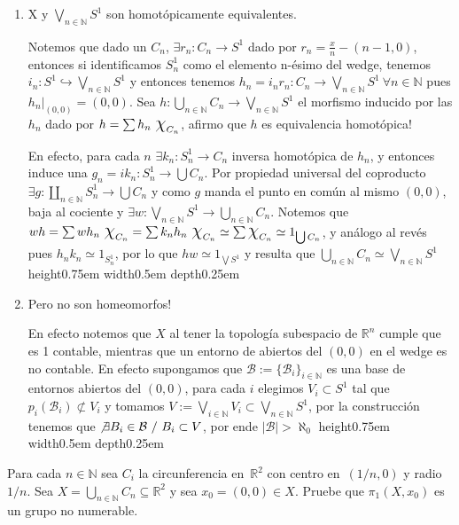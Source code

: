 \documentclass[11pt]{article}
\newcommand{\R}{{\mathbb{R}}}
\newcommand{\N}{{\mathbb{N}}}
\newenvironment{proof}[1][Demostraci\'on]{\begin{trivlist}
\item[\hskip \labelsep {\bfseries #1}]}{\end{trivlist}}
\newcommand{\qed}{\nobreak \ifvmode \relax \else
      \ifdim\lastskip<1.5em \hskip-\lastskip
      \hskip1.5em plus0em minus0.5em \fi \nobreak
      \vrule height0.75em width0.5em depth0.25em\fi}
\newcommand{\B}{\mathcal{B}}
\newcommand{\inc}{\hookrightarrow}
\begin{document}
\begin{enumerate}
\begin{proof}
\begin{enumerate}
\begin{itemize}
\end{itemize}

\item {X y $\bigvee_{n \in \N} {S^1}$ son homot\'opicamente equivalentes.}

Notemos que dado un $C_n$, $\exists r_n:C_n \rightarrow S^1$ dado por $r_n = \frac{x}{n} -(n-1,0)$, entonces si identificamos $S^1_n$ como el elemento n-\'esimo del wedge, tenemos $i_n : S^1 \inc \bigvee_{n \in \N}{S^1}$ y entonces tenemos $h_n = i_n r_n : C_n \rightarrow \bigvee_{n \in \N}{S^1} \ \forall n \in \N$ pues $h_n|_{(0,0)}=(0,0)$. Sea $h : \bigcup_{n \in \N}{C_n} \rightarrow \bigvee_{n \in \N}{S^1}$ el morfismo inducido por las $h_n$ dado por $h = \sum {h_n \ \mbox{\Large$\chi$}_{C_n}}$, afirmo que $h$ es equivalencia homot\'opica!

En efecto, para cada $n$ $\exists k_n : S^1_n \rightarrow C_n$ inversa homot\'opica de $h_n$, y entonces induce una $g_n = i k_n : S^1_n \rightarrow \bigcup C_n$. Por propiedad universal del coproducto $\exists g: \coprod_{n \in \N}{S^1_n} \rightarrow \bigcup C_n$ y como $g$ manda el punto en com\'un al mismo $(0,0)$, baja al cociente y $\exists w : \bigvee_{n \in \N}{S^1} \rightarrow \bigcup_{n \in \N} {C_n}$. Notemos que $wh = \sum {wh_n \ \mbox{\Large$\chi$}_{C_n}} = \sum {k_nh_n \ \mbox{\Large$\chi$}_{C_n}} \simeq \sum {\mbox{\Large$\chi$}_{C_n}} \simeq 1_{\bigcup{C_n}}$, y an\'alogo al rev\'es pues $h_nk_n \simeq 1_{S^1_{n}}$, por lo que $hw \simeq 1_{\bigvee {S^1}}$ y resulta que $\bigcup_{n \in \N}{C_n} \simeq \bigvee_{n \in \N}{S^1}$ \qed

\item {Pero no son homeomorfos!}

En efecto notemos que $X$ al tener la topolog\'ia subespacio de $\R^n$ cumple que es 1 contable, mientras que un entorno de abiertos del $(0,0)$ en el wedge es no contable. En efecto supongamos que $\B := \{\B_i\}_{i \in \N}$ es una base de entornos abiertos del $(0,0)$, para cada $i$ elegimos $V_i \subset S^1$ tal que $p_i(\B_i) \not \subset V_i$ y tomamos $V:=\bigvee_{i \in \N}{V_i} \subset \bigvee_{n \in \N}{S^1}$, por la construcci\'on tenemos que $\not \exists B_i \in \B \ / \ B_i \subset V$, por ende $|\B| > \aleph_0$ \qed

\end{enumerate}

\end{proof}


\item {Para cada $n\in \N$ sea $C_i$ la circunferencia en~$ \R^2$ con centro en~$(1/n,0)$ y radio~$1/n$. Sea $X=\bigcup_{n\in \N} C_n\subseteq  \R^ 2$ y sea $x_0=(0,0)\in X$. Pruebe que  $\pi_1(X,x_0)$ es un grupo no numerable.}


\end{enumerate}
\end{document}
